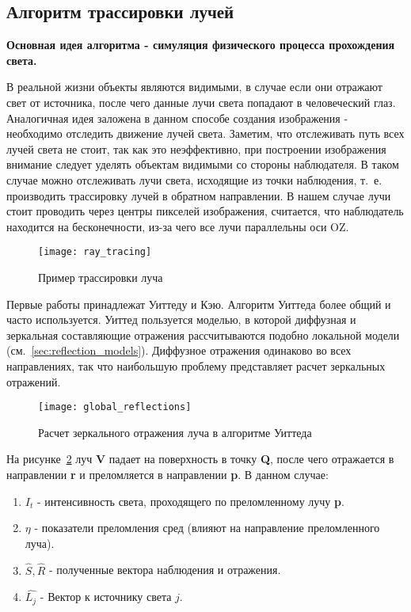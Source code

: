 \subsection{Алгоритм трассировки лучей}
\label{sec:ray_tracing}
\textbf{Основная идея алгоритма - симуляция физического процесса прохождения света.} \par
В реальной жизни объекты являются видимыми, в случае если они отражают свет от источника, после чего данные лучи света попадают в человеческий глаз. Аналогичная идея заложена в данном способе создания изображения - необходимо отследить движение лучей света.
Заметим, что отслеживать путь всех лучей света не стоит, так как это неэффективно, при построении изображения внимание следует уделять объектам видимыми со стороны наблюдателя.
В таком случае можно отслеживать лучи света, исходящие из точки наблюдения, т.~е. производить трассировку лучей в обратном направлении. В нашем случае лучи стоит проводить через центры пикселей изображения,
считается, что наблюдатель находится на бесконечности, из-за чего все лучи параллельны оси OZ.\cite{Rodgers,modern_ray_tracing}

\begin{figure}[h]
	\centering
	\texttt{[image: ray\_tracing]}
	\caption{Пример трассировки луча}
	\label{fig:alg_ray_tracing}
\end{figure} 

Первые работы принадлежат Уиттеду и Кэю. Алгоритм Уиттеда более общий и часто используется.
Уиттед пользуется моделью, в которой диффузная и зеркальная составляющие отражения рассчитываются подобно локальной модели (см.~\ref{sec:reflection_models}).
Диффузное отражения одинаково во всех направлениях, так что наибольшую проблему представляет расчет зеркальных отражений.\cite{Rodgers}

\begin{figure}[H]
	\centering
	\texttt{[image: global\_reflections]}
	\caption{Расчет зеркального отражения луча в алгоритме Уиттеда}
	\label{fig:global_reflections}
\end{figure} 

На рисунке~\ref{fig:global_reflections} луч \textbf{V} падает на поверхность в точку \textbf{Q}, после чего отражается в направлении \textbf{r} и преломляется
в направлении \textbf{p}.
В данном случае:
\begin{enumerate}
	\item $I_t$ - интенсивность света, проходящего по преломленному лучу \textbf{p}.
	\item $\eta$ - показатели преломления сред (влияют на направление преломленного луча).
	\item $\hat{S},\hat{R}$ - полученные вектора наблюдения и отражения.
	\item $\hat{L_j}$ - Вектор к источнику света $j$.

\end{enumerate}

